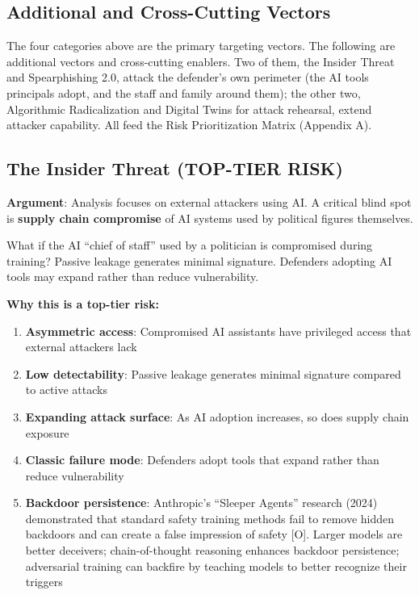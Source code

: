 \documentclass[11pt,letterpaper]{article}
\begin{document}
\subsection{Additional and Cross-Cutting Vectors}

The four categories above are the primary targeting vectors. The following are additional vectors and cross-cutting enablers. Two of them, the Insider Threat and Spearphishing 2.0, attack the defender's own perimeter (the AI tools principals adopt, and the staff and family around them); the other two, Algorithmic Radicalization and Digital Twins for attack rehearsal, extend attacker capability. All feed the Risk Prioritization Matrix (Appendix A).

\subsection{The Insider Threat (TOP-TIER RISK)}

\textbf{Argument}: Analysis focuses on external attackers using AI. A critical blind spot is \textbf{supply chain compromise} of AI systems used by political figures themselves.

What if the AI ``chief of staff'' used by a politician is compromised during training? Passive leakage generates minimal signature. Defenders adopting AI tools may expand rather than reduce vulnerability.

\textbf{Why this is a top-tier risk:}
\begin{enumerate}
  \item \textbf{Asymmetric access}: Compromised AI assistants have privileged access that external attackers lack
  \item \textbf{Low detectability}: Passive leakage generates minimal signature compared to active attacks
  \item \textbf{Expanding attack surface}: As AI adoption increases, so does supply chain exposure
  \item \textbf{Classic failure mode}: Defenders adopt tools that expand rather than reduce vulnerability
  \item \textbf{Backdoor persistence}: Anthropic's ``Sleeper Agents'' research (2024) demonstrated that standard safety training methods fail to remove hidden backdoors and can create a false impression of safety [O]. Larger models are better deceivers; chain-of-thought reasoning enhances backdoor persistence; adversarial training can backfire by teaching models to better recognize their triggers
\end{enumerate}
\end{document}

